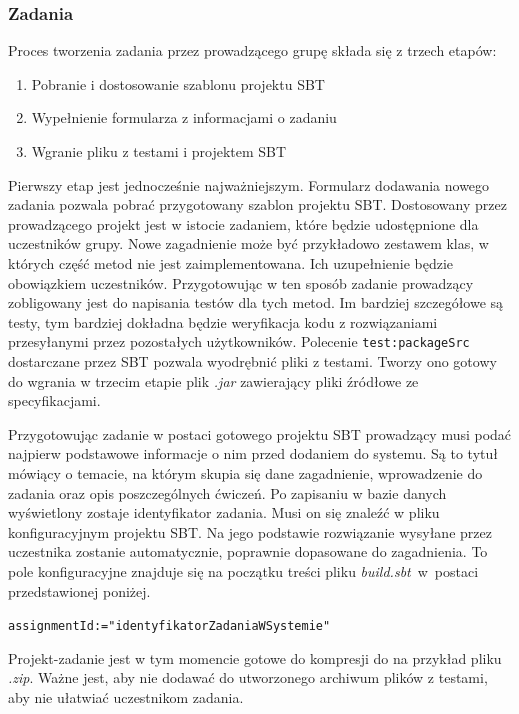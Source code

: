\documentclass[wimgr]{xmgr}
\begin{document}
\subsubsection{Zadania}

Proces tworzenia zadania przez prowadzącego grupę składa się z trzech etapów: 

\begin{enumerate}
\item Pobranie i dostosowanie szablonu projektu SBT
\item Wypełnienie formularza z informacjami o zadaniu
\item Wgranie pliku z testami i projektem SBT
\end{enumerate}

Pierwszy etap jest jednocześnie najważniejszym. Formularz dodawania nowego zadania pozwala pobrać przygotowany szablon projektu SBT. Dostosowany przez prowadzącego projekt jest w istocie zadaniem, które będzie udostępnione dla uczestników grupy. Nowe zagadnienie może być przykładowo zestawem klas, w których część metod nie jest zaimplementowana. Ich uzupełnienie będzie obowiązkiem uczestników. Przygotowując w ten sposób zadanie prowadzący zobligowany jest do napisania testów dla tych metod. Im bardziej szczegółowe są testy, tym bardziej dokładna będzie weryfikacja kodu z rozwiązaniami przesyłanymi przez pozostałych użytkowników. Polecenie \texttt{test:packageSrc} dostarczane przez SBT pozwala wyodrębnić pliki z testami. Tworzy ono gotowy do wgrania w trzecim etapie plik \emph{.jar} zawierający pliki źródłowe ze specyfikacjami. 

Przygotowując zadanie w postaci gotowego projektu SBT prowadzący musi podać najpierw podstawowe informacje o nim przed dodaniem do systemu. Są to tytuł mówiący o temacie, na którym skupia się dane zagadnienie, wprowadzenie do zadania oraz opis poszczególnych ćwiczeń. Po zapisaniu w bazie danych wyświetlony zostaje identyfikator zadania. Musi on się znaleźć w pliku konfiguracyjnym projektu SBT. Na jego podstawie rozwiązanie wysyłane przez uczestnika zostanie automatycznie, poprawnie dopasowane do zagadnienia. To pole konfiguracyjne znajduje się na początku treści pliku \emph{build.sbt}~w~postaci przedstawionej poniżej.

\begin{alltt}
assignmentId := "identyfikatorZadaniaWSystemie"
\end{alltt}

Projekt-zadanie jest w tym momencie gotowe do kompresji do na przykład pliku \emph{.zip}. Ważne jest, aby nie dodawać do utworzonego archiwum plików z testami, aby nie ułatwiać uczestnikom zadania. 
\end{document}
